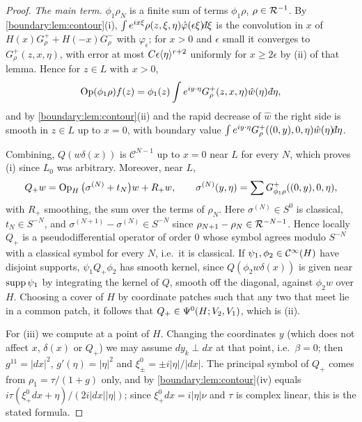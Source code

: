 \begin{proof}
\emph{The main term.} $\phi_1\rho_N$ is a finite sum of terms $\phi_1\rho$, $\rho\in
\mathcal{R}^{-1}$. By \cref{boundary:lem:contour}(i), $\int e^{ix\xi}\rho(z,\xi,\eta)\hat
\varphi(\epsilon\xi)\dbar\xi$ is the convolution in $x$ of
$H(x)G^+_\rho+H(-x)G^-_\rho$ with $\varphi_\epsilon$; for $x>0$ and $\epsilon$ small
it converges to $G^+_\rho(z,x,\eta)$, with error at most $C\epsilon\langle \eta\rangle^{r+2}$
uniformly for $x\ge2\epsilon$ by (ii) of that lemma. Hence for $z\in L$ with $x>0$,
\begin{equation*}
\Op(\phi_1\rho)f(z)=\phi_1(z)\int e^{iy\cdot\eta}G^+_\rho(z,x,\eta)\hat w(\eta)\,
\dbar\eta,
\end{equation*}
and by \cref{boundary:lem:contour}(ii) and the rapid decrease of $\hat w$ the right side
is smooth in $z\in L$ up to $x=0$, with boundary value $\int e^{iy\cdot\eta}
G^+_\rho((0,y),0,\eta)\hat w(\eta)\dbar\eta$.

Combining, $Q(w\delta(x))$ is $\mathcal{C}^{N-1}$ up to $x=0$ near $L$ for every $N$,
which proves (i) since $L_0$ was arbitrary. Moreover, near $L$,
\begin{equation*}
Q_+w=\operatorname{Op}_H\big(\sigma^{(N)}+t_N\big)w+R_+w,\qquad\sigma^{(N)}(y,\eta)=
\sum G^+_{\phi_1\rho}((0,y),0,\eta),
\end{equation*}
with $R_+$ smoothing, the sum over the terms of $\rho_N$. Here $\sigma^{(N)}\in S^0$
is classical, $t_N\in S^{-N}$, and $\sigma^{(N+1)}-\sigma^{(N)}\in S^{-N}$ since
$\rho_{N+1}-\rho_N\in\mathcal{R}^{-N-1}$. Hence locally $Q_+$ is a pseudodifferential operator
of order $0$ whose symbol agrees modulo $S^{-N}$ with a classical symbol for every
$N$, i.e.\ it is classical. If $\psi_1,\phi_2\in\mathcal{C}^\infty(H)$ have disjoint supports,
$\psi_1Q_+\phi_2$ has smooth kernel, since $Q(\phi_2w\delta(x))$ is given near
$\operatorname{supp}\psi_1$ by integrating the kernel of $Q$, smooth off the diagonal, against
$\phi_2w$ over $H$. Choosing a cover of $H$ by coordinate patches such that any two
that meet lie in a common patch, it follows that $Q_+\in\Psi^{0}(H;V_2,V_1)$, which
is (ii).

For (iii) we compute at a point of $H$. Changing the coordinates $y$ (which does not
affect $x$, $\delta(x)$ or $Q_+$) we may assume $dy_k\perp dx$ at that point, i.e.\
$\beta=0$; then $g^{11}=|dx|^2$, $g'(\eta)=|\eta|^2$ and $\xi^0_\pm=\pm i|\eta|/|dx|$.
The principal symbol of $Q_+$ comes from $\rho_1=\tau/(1+g)$ only, and by
\cref{boundary:lem:contour}(iv) equals
$i\tau(\xi^0_+dx+\eta)/(2i|dx||\eta|)$; since $\xi^0_+dx=i|\eta|\nu$ and $\tau$ is
complex linear, this is the stated formula.
\end{proof}

